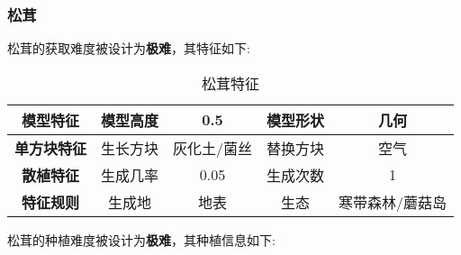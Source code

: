 \subsubsection{松茸}

松茸的获取难度被设计为\textbf{极难}，其特征如下:
\begin{table}[H]
    \centering
    \caption{松茸特征}
    \label{table:松茸特征}
    \setlength{\tabcolsep}{4mm}
    \begin{tabular}{c|cc|cc}
        \toprule
        \textbf{模型特征}   & 模型高度 & 0.5      & 模型形状 & 几何     \\
        \midrule
        \textbf{单方块特征} & 生长方块 & 灰化土/菌丝 & 替换方块 & 空气     \\
        \midrule
        \textbf{散植特征}   & 生成几率 & 0.05   & 生成次数 & 1        \\
        \midrule
        \textbf{特征规则}   & 生成地   & 地表   & 生态     & 寒带森林/蘑菇岛 \\
        \bottomrule
    \end{tabular}
\end{table}


松茸的种植难度被设计为\textbf{极难}，其种植信息如下:

